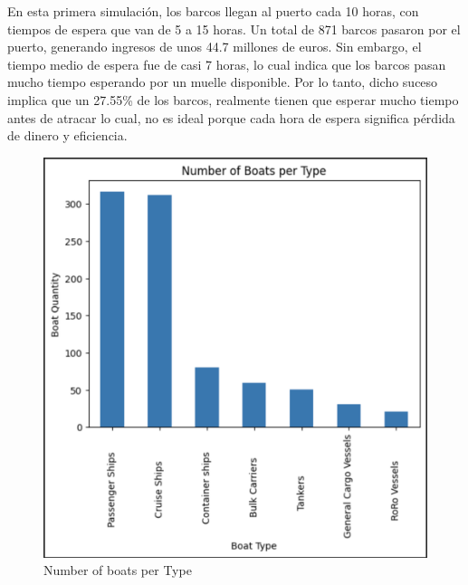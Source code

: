 \documentclass[12pt]{article}
\begin{document}
    En esta primera simulación, los barcos llegan al puerto cada 10 horas, con tiempos de espera que van de 5 a 15 horas. Un total de 871 barcos pasaron por el puerto, generando ingresos de unos 44.7 millones de euros. Sin embargo, el tiempo medio de espera fue de casi 7 horas, lo cual indica que los barcos pasan mucho tiempo esperando por un muelle disponible. Por lo tanto, dicho suceso implica que un 27.55\% de los barcos, realmente tienen que esperar mucho tiempo antes de atracar lo cual, no es ideal porque cada hora de espera significa pérdida de dinero y eficiencia.

    \begin{figure}[H]
    \centering
    \begin{minipage}{0.5\textwidth}
        \centering
        \includegraphics[width=\linewidth]{SIMUlACION 1.1.png}  
        \caption{Number of boats per Type}
        \label{fig:grafica1}
    \end{minipage}\hfill
    \begin{minipage}{0.5\textwidth}
        \centering

\end{minipage}
\end{figure}
\end{document}
